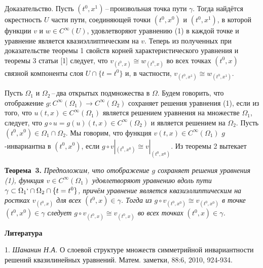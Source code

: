 Доказательство. Пусть $(t^0,x^1)$\,--\,произвольная точка пути $\gamma$. Тогда
найдётся окрестность $U$ части пути, соединяющей точки $(t^0,x^0)$ и $(t^0,x^1)$, в которой функции $v$ и $w\in C^{\infty}(U)$, удовлетворяют уравнению (1) в каждой точке и уравнение является квазиэллиптическим на $v$.
Теперь из полученных при доказательстве теоремы 1 свойств корней характеристического уравнения и теоремы 3 статьи [1] следует, что $v_{(t^0,x)}\cong w_{(t^0,x)}$ во всех точках $(t^0,x)$ связной компоненты слоя $U\cap\{t=t^0\}$ и, в частности, $v_{(t^0,x^1)}\cong w_{(t^0,x^1)}$.



Пусть $\Omega_1$ и $\Omega_2$\,--\,два открытых подмножества в $\Omega$.
Будем говорить, что отображение
$g:C^{\infty}(\Omega_1)\to C^{\infty}(\Omega_2)$
сохраняет решения уравнения (1),
если из того, что $u(t,x)\in C^{\infty}(\Omega_1)$ является решением уравнения
на множестве $\Omega_1$, следует, что $g\circ u=g(u)(t,x)\in C^{\infty}(\Omega_2)$
и является решением на $\Omega_2$. Пусть $(t^0,x^0)\in \Omega_1\cap\Omega_2$.
Мы говорим, что функция $v(t,x)\in C^{\infty}(\Omega_1)$ $g$-инвариантна в $(t^0,x^0)$, если $g\circ v|_{(t^0,x^0)}\cong v|_{(t^0,x^0)}$. Из теоремы 2
вытекает

\textbf{Теорема~3.} {\it 
Предположим, что отображение $g$ сохраняет решения уравнения {\rm (1)},
функция $v\in C^{\infty}(\Omega_1)$ удовлетворяют уравнению вдоль пути $\gamma\subset\Omega_1`\cap\Omega_2\cap\{t=t^0\}$, причём уравнение
является квазиэллиптическим на ростках $v_{(t^0,x)}$ для всех $(t^0,x)\in\gamma$. Тогда из $g\circ v_{(t^0,x^0)}\cong v_{(t^0,x^0)}$ в точке
$(t^0,x^0)\in\gamma$ следует $g\circ v_{(t^0,x)}\cong v_{(t^0,x)}$ во всех точках
$(t^0,x)\in\gamma$.
}




\smallskip \centerline {\bf Литература} \nopagebreak

1. {\it Шананин Н.А.} О слоевой структуре множеств симметрийной инвариантности решений квазилинейных уравнений. Матем. заметки, 88:6, 2010, 924-934.
